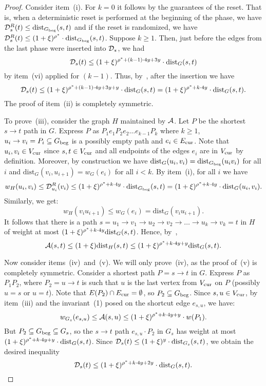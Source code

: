 \documentclass[11pt,letterpaper]{article}
\theoremstyle{plain}
\newcommand{\dist}{\mathrm{dist}}
\newcommand{\wei}{w}
\begin{document}
\begin{proof}
Consider item~(i). For $k=0$ it follows by the guarantees of the reset. That is, when a deterministic
reset is performed at the beginning of the phase, we have $\dsto_s(t)\leq \dist_{\Gbeg}(s,t)$
  and if the reset is randomized, we have $\dsto_s(t)\leq (1+\epsp)^{\roff^*}\cdot \dist_{\Gbeg}(s,t)$.
Suppose $k\geq 1$. 
Then, just before the edges from the last phase were inserted into $\mathcal{D}_s$, we had
  \[\dsfrom_s(t)\leq (1+\epsp)^{\roff^*+(k-1)\cdot 4y+3y}\cdot\dist_G(s,t)\] by item~(vi) applied
for $(k-1)$.
Thus, by~, after the insertion we have
  \[ \dsfrom_s(t)\leq (1+\epsp)^{\roff^*+(k-1)\cdot 4y+3y+y}\cdot\dist_G(s,t)=(1+\epsp)^{\roff^*+k\cdot 4y}\cdot \dist_G(s,t). \]
The proof of item~(ii) is completely symmetric.

To prove~(iii), consider the graph $H$ maintained by $\mathcal{A}$. Let $P$ be the shortest $s\to t$ path in $G$. Express $P$ as $P_1e_1P_2e_2\ldots e_{k-1}P_k$ where
$k\geq 1$, $u_i\to v_i=P_i\subseteq G_{\mathrm{beg}}$ is a possibly empty path and $e_i\in E_{\mathrm{cur}}$.
Note that $u_i,v_i\in V_{\mathrm{cur}}$ since $s,t\in V_{\mathrm{cur}}$ and all endpoints of the edges $e_i$ are in $V_{\mathrm{cur}}$
by definition.
Moreover, by construction we have $\dist_G(u_i,v_i)=\dist_{\Gbeg}(u_iv_i)$ for all $i$
and $\dist_G(v_i,u_{i+1})=\wei_G(e_i)$ for all $i<k$.
By item~(i), for all $i$ we have
\[ \wei_H(u_i,v_i)\leq \dsto_{u_i}(v_i)\leq (1+\epsp)^{\roff^*+k\cdot 4y}\cdot \dist_{\Gbeg}(s,t)=(1+\epsp)^{\roff^*+k\cdot 4y}\cdot \dist_{G}(u_i,v_i). \]
Similarly, we get:
\[ \wei_H(v_iu_{i+1})\leq \wei_G(e_i) = \dist_G(v_iu_{i+1}).\]
It follows that there is a path $s=u_1\to v_1\to u_2\to v_2\to \ldots \to u_k\to v_k=t$ in $H$ of weight at most $(1+\epsp)^{\roff^*+k\cdot 4y}\dist_G(s,t)$.
Hence, by~,
\[\apsp(s,t)\leq (1+\epsp)\dist_H(s,t)\leq (1+\epsp)^{\roff^*+k\cdot 4y+y}\dist_G(s,t).\]

Now consider items~(iv)~and~(v). We will only prove~(iv), as the proof of~(v) is completely symmetric.
Consider a shortest path $P=s\to t$ in $G$. Express $P$ as $P_1P_2$, where $P_2=u\to t$ is such that $u$ is the last vertex from $V_{\mathrm{cur}}$ on $P$ (possibly $u=s$ or $u=t$).
Note that $E(P_2)\cap E_{\mathrm{cur}}=\emptyset$, so $P_2\subseteq G_{\mathrm{beg}}$.
Since $s,u\in V_{\mathrm{cur}}$, by item~(iii) and the invariant~(1) posed on the shortcut edge $e_{s,u}$,
we have:
\[ \wei_{G_s}(e_{s,u})\leq \apsp(s,u)\leq (1+\epsp)^{\roff^*+k\cdot 4y+y}\cdot \wei(P_1).\]
But $P_2\subseteq G_{\mathrm{beg}}\subseteq G_s$, so the $s\to t$ path $e_{s,u}\cdot P_2$ in $G_s$ has weight at most $(1+\epsp)^{\roff^*+k\cdot 4y+y}\cdot \dist_G(s,t)$.
Since $\dsfrom_{s}(t)\leq (1+\epsp)^y\cdot \dist_{G_s}(s,t)$, we obtain the desired inequality
\[ \dsfrom_s(t)\leq (1+\epsp)^{\roff^*+k\cdot 4y+2y}\cdot \dist_G(s,t). \]


\end{proof}
\end{document}
